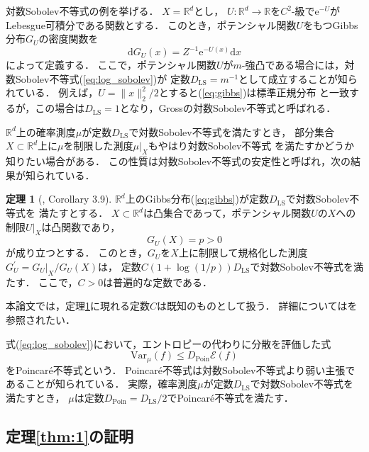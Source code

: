 \documentclass{jarticle}
\newcommand{\dd}{\mathrm{d}}
\newcommand{\ee}{\mathrm{e}}
\theoremstyle{definition}
\newtheorem{thm}{定理}
\begin{document}
対数Sobolev不等式の例を挙げる．
$X=\mathbb{R}^d$とし，
$U: \mathbb{R}^d \to \mathbb{R}$を$C^2$-級で$\ee^{-U}$がLebesgue可積分である関数とする．
このとき，ポテンシャル関数$U$をもつGibbs分布$G_U$の密度関数を
\begin{equation}
\dd G_U (x) = Z^{-1} \ee ^{-U(x)} \dd x 
\label{eq:gibbs}
\end{equation}
によって定義する．
ここで，ポテンシャル関数$U$が$m$-強凸である場合には，対数Sobolev不等式(\ref{eq:log_sobolev})が
定数$D_{\mathrm{LS}} = m^{-1}$として成立することが知られている\cite{Ledoux1999}．
例えば，$U=\parallel x \parallel_{2}^{2} / 2$とすると(\ref{eq:gibbs})は標準正規分布
と一致するが，この場合は$D_{\mathrm{LS}}=1$となり，Grossの対数Sobolev不等式と呼ばれる．

$\mathbb{R}^d$上の確率測度$\mu$が定数$D_\mathrm{LS}$で対数Sobolev不等式を満たすとき，
部分集合$X\subset \mathbb{R}^d$上に$\mu$を制限した測度$\mu |_{X}$もやはり対数Sobolev不等式
を満たすかどうか知りたい場合がある．
この性質は対数Sobolev不等式の安定性と呼ばれ，次の結果が知られている．
\begin{thm}[\cite{Milman2012}, Corollary 3.9]
\label{thm:stability}
$\mathbb{R}^d$上のGibbs分布(\ref{eq:gibbs})が定数$D_\mathrm{LS}$で対数Sobolev不等式を
満たすとする．
$X \subset \mathbb{R}^d$は凸集合であって，ポテンシャル関数$U$の$X$への制限$U|_X$は凸関数であり，
\begin{equation}
G_U(X) = p > 0
\end{equation}
が成り立つとする．
このとき，$G_U$を$X$上に制限して規格化した測度$G_U^\prime = G_U|_X / G_U(X)$は，
定数$C(1+\log(1/p))D_\mathrm{LS}$で対数Sobolev不等式を満たす．
ここで，$C > 0$は普遍的な定数である．
\end{thm}
本論文では，定理\ref{thm:stability}に現れる定数$C$は既知のものとして扱う．
詳細については\cite{Milman2012}を参照されたい．

式(\ref{eq:log_sobolev})において，エントロピーの代わりに分散を評価した式
\begin{equation}
\mathrm{Var}_\mu (f) \leq D_{\mathrm{Poin}} \mathcal{E}(f)
\label{eq:poin}
\end{equation}
をPoincar\'{e}不等式という．
Poincar\'{e}不等式は対数Sobolev不等式より弱い主張であることが知られている．
実際，確率測度$\mu$が定数$D_\mathrm{LS}$で対数Sobolev不等式を満たすとき，
$\mu$は定数$D_\mathrm{Poin} = D_\mathrm{LS}/2$でPoincar\'{e}不等式を満たす\cite{Aida1994}．

\subsection{定理\ref{thm:1}の証明}
\end{document}
